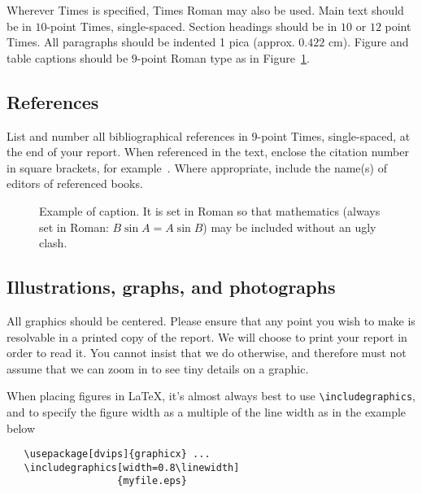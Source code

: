 \documentclass[10pt,twocolumn,letterpaper]{article}
\begin{document}
Wherever Times is specified, Times Roman may also be used.  Main text should be in $10$-point Times, single-spaced. Section headings should be in $10$ or $12$ point Times.  All paragraphs should be indented 1 pica (approx. $0.422$ cm).  Figure and table captions should be $9$-point Roman type as in 
Figure~\ref{fig:onecol}.

\subsection{References}

List and number all bibliographical references in $9$-point Times, single-spaced,
at the end of your report. When referenced in the text, enclose the citation
number in square brackets, for example~\cite{Authors14}.  Where appropriate,
include the name(s) of editors of referenced books.

\begin{figure}[t]
\begin{center}
\fbox{\rule{0pt}{1.8in} \rule{0.9\linewidth}{0pt}}
\end{center}
   \caption{Example of caption.  It is set in Roman so that mathematics
   (always set in Roman: $B \sin A = A \sin B$) may be included without an
   ugly clash.}
\label{fig:long}
\label{fig:onecol}
\end{figure}

\subsection{Illustrations, graphs, and photographs}

All graphics should be centered.  Please ensure that any point you wish to make is resolvable in a printed copy of the report. We will choose to print your report in order to read it.  You cannot insist that we do otherwise, and therefore must not assume that we can zoom in to see tiny details on a graphic.

When placing figures in \LaTeX, it's almost always best to use \verb+\includegraphics+, and to specify the  figure width as a multiple of the line width as in the example below
{\small\begin{verbatim}
   \usepackage[dvips]{graphicx} ...
   \includegraphics[width=0.8\linewidth]
                   {myfile.eps}
\end{verbatim}
}


{\small


}
\end{document}
